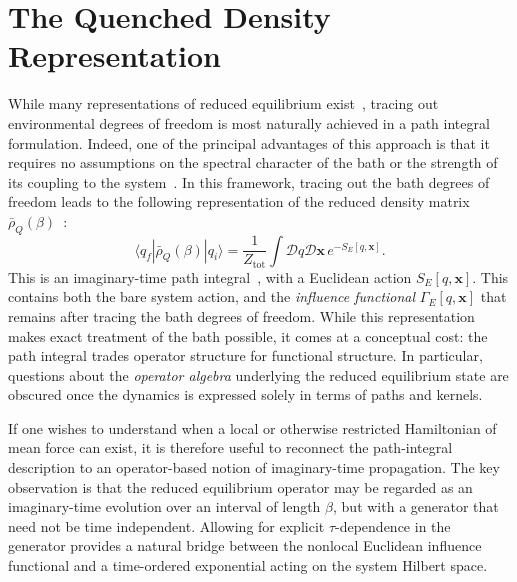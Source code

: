 \section{\label{sec:quenched}The Quenched Density Representation}


While many representations of reduced equilibrium exist~\cite{weissQuantumDissipativeSystems2012, breuerTheoryOpenQuantum2002, grabertQuantumBrownianMotion1988}, tracing out environmental degrees of freedom is most naturally achieved in a path integral formulation. Indeed, one of the principal advantages of this approach is that it requires no assumptions on the spectral character of the bath or the strength of its coupling to the system~\cite{weissQuantumDissipativeSystems2012}. In this framework, tracing out the bath degrees of freedom leads to the following representation of the reduced density matrix $\bar{\rho}_Q(\beta)$~\cite{feynmanQuantumMechanicsPath1965, kleinertPathIntegralsQuantum2009}:
\begin{equation}
    \langle q_f|\bar{\rho}_Q(\beta)|q_i\rangle = \frac{1}{Z_{\mathrm{tot}}} \int \mathcal{D}q \mathcal{D}\mathbf{x} \, e^{-S_E[q,\mathbf{x}]}.
\end{equation}
This is an imaginary-time path integral~\cite{feynmanQuantumMechanicsPath1965, kleinertPathIntegralsQuantum2009}, with a Euclidean action $S_E[q,\mathbf{x}]$. This contains both the bare system action, and the \emph{influence functional} $\Gamma_E[q,\mathbf{x}]$ that remains after tracing the bath degrees of freedom. While this representation makes exact treatment of the bath possible, it comes at a conceptual cost: the path
integral trades operator structure for functional structure. In particular,
questions about the \emph{operator algebra} underlying the reduced equilibrium
state are obscured once the dynamics is expressed solely in terms of paths and
kernels.

If one wishes to understand when a local or otherwise restricted Hamiltonian of
mean force can exist, it is therefore useful to reconnect the path-integral
description to an operator-based notion of imaginary-time propagation. The key
observation is that the reduced equilibrium operator may be regarded as an
imaginary-time evolution over an interval of length $\beta$, but with a generator
that need not be time independent. Allowing for explicit $\tau$-dependence in
the generator provides a natural bridge between the nonlocal Euclidean influence
functional and a time-ordered exponential acting on the system Hilbert space.

